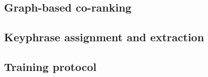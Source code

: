   \subsection{Graph-based co-ranking}
  \label{subsec:graph_based_co_ranking}

  \subsection{Keyphrase assignment and extraction}
  \label{subsec:keyphrase_assignment_and_extraction}

  \subsection{Training protocol}
  \label{subsec:training_protocol}

